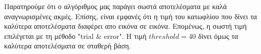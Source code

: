 Παρατηρούμε ότι ο αλγόριθμος μας παράγει σωστά αποτελέσματα με καλά αναγνωρισμένες ακμές. Επίσης, είναι εμφανές ότι η τιμή του κατωφλίου που δίνει τα καλύτερα αποτελέσματα διαφέρει απο εικόνα σε εικόνα. Επομένως, η σωστή τιμή επιλέγεται με τη μέθοδο "trial \& error". H τιμή $threshold = 40 $ δίνει όμως τα καλύτερα αποτελέσματα σε σταθερή βάση.
